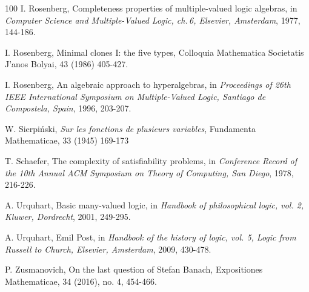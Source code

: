 \documentclass[11pt]{article}
\theoremstyle{plain}
\theoremstyle{definition}
\begin{document}
{\begin{thebibliography}{100}
 I. Rosenberg, Completeness properties of multiple-valued logic algebras, in {\it Computer Science and Multiple-Valued Logic, ch.\,6, Elsevier, Amsterdam}, 1977, 144-186.

 I. Rosenberg, Minimal clones I: the five types, Colloquia Mathematica Societatis J'anos Bolyai, 43 (1986) 405-427.

 I. Rosenberg, An algebraic approach to hyperalgebras, in {\it Proceedings of 26th IEEE International Symposium on Multiple-Valued Logic, Santiago de Compostela, Spain}, 1996, 203-207.


 W. Sierpi\'nski, {\it Sur les fonctions de plusieurs variables}, Fundamenta Mathematicae, 33 (1945) 169-173 

 T. Schaefer, The complexity of satisfiability problems, in {\it Conference Record of the 10th Annual ACM Symposium on Theory of Computing, San Diego}, 1978, 216-226.

 A. Urquhart, Basic many-valued logic, in {\it Handbook of philosophical logic, vol. 2, Kluwer, Dordrecht}, 2001, 249-295.

 A. Urquhart, Emil Post, in {\it Handbook of the history of logic, vol. 5, Logic from Russell to Church, Elsevier, Amsterdam}, 2009, 430-478.

 P. Zusmanovich, On the last question of Stefan Banach, Expositiones Mathematicae, 34 (2016), no. 4, 454-466. 


\end{thebibliography}
}
\end{document}
